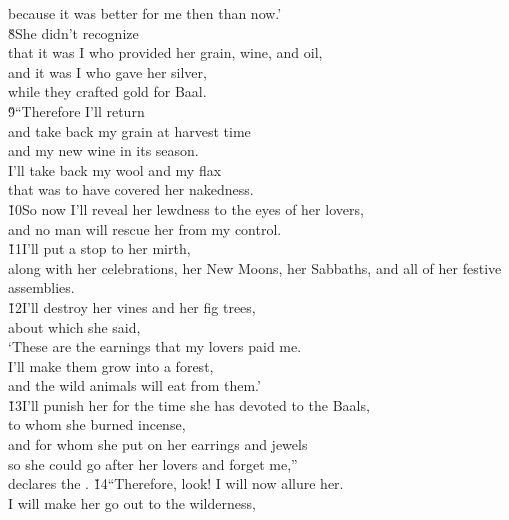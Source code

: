 \begin{poetry}
\poemlll       because it was better for me then than now.' \\
\poeml \v{8}She didn't recognize \\
\poemll    that it was I who provided her grain, wine, and oil, \\
\poeml and it was I who gave her silver, \\
\poemll    while they crafted gold for Baal. \\
\poeml \v{9}``Therefore I'll return \\
\poemll    and take back my grain at harvest time \\
\poemlll       and my new wine in its season. \\
\poeml I'll take back my wool and my flax \\
\poemll    that was to have covered her nakedness. \\
\poeml \v{10}So now I'll reveal her lewdness to the eyes of her lovers, \\
\poemll    and no man will rescue her from my control. \\
\poeml \v{11}I'll put a stop to her mirth, \\
\poemll    along with her celebrations, her New Moons, her Sabbaths, and all of her festive assemblies. \\
\poeml \v{12}I'll destroy her vines and her fig trees, \\
\poemll    about which she said, \\
\poeml `These are the earnings that my lovers paid me. \\
\poemll    I'll make them grow into a forest, \\
\poemlll       and the wild animals will eat from them.' \\
\poeml \v{13}I'll punish her for the time she has devoted to the Baals, \\
\poemll    to whom she burned incense, \\
\poeml and for whom she put on her earrings and jewels \\
\poemll    so she could go after her lovers and forget me,'' \\
\poemlll       declares the .
\poeml \v{14}``Therefore, look! I will now allure her. \\
\poemll    I will make her go out to the wilderness, \\

\end{poetry}
